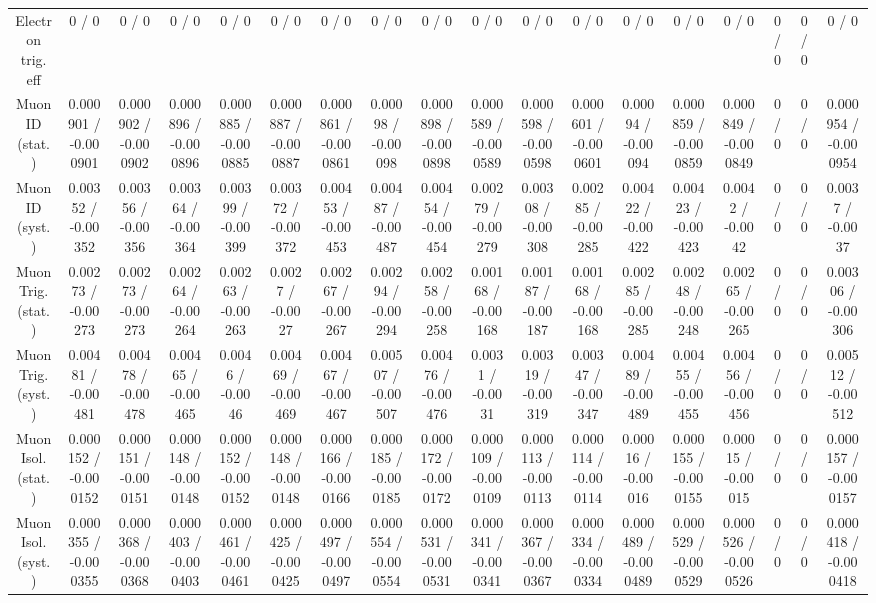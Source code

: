 \documentclass[10pt]{article}
\begin{document}
\begin{table}[htbp]
\begin{center}
\begin{tabular}{|c|c|c|c|c|c|c|c|c|c|c|c|c|c|c|c|c|c|}
  Electron trig. eff & 0 / 0 & 0 / 0 & 0 / 0 & 0 / 0 & 0 / 0 & 0 / 0 & 0 / 0 & 0 / 0 & 0 / 0 & 0 / 0 & 0 / 0 & 0 / 0 & 0 / 0 & 0 / 0 & 0 / 0 & 0 / 0 & 0 / 0 \\ 
  Muon ID (stat.) & 0.000901 / -0.000901 & 0.000902 / -0.000902 & 0.000896 / -0.000896 & 0.000885 / -0.000885 & 0.000887 / -0.000887 & 0.000861 / -0.000861 & 0.00098 / -0.00098 & 0.000898 / -0.000898 & 0.000589 / -0.000589 & 0.000598 / -0.000598 & 0.000601 / -0.000601 & 0.00094 / -0.00094 & 0.000859 / -0.000859 & 0.000849 / -0.000849 & 0 / 0 & 0 / 0 & 0.000954 / -0.000954 \\ 
  Muon ID (syst.) & 0.00352 / -0.00352 & 0.00356 / -0.00356 & 0.00364 / -0.00364 & 0.00399 / -0.00399 & 0.00372 / -0.00372 & 0.00453 / -0.00453 & 0.00487 / -0.00487 & 0.00454 / -0.00454 & 0.00279 / -0.00279 & 0.00308 / -0.00308 & 0.00285 / -0.00285 & 0.00422 / -0.00422 & 0.00423 / -0.00423 & 0.0042 / -0.0042 & 0 / 0 & 0 / 0 & 0.0037 / -0.0037 \\ 
  Muon Trig. (stat.) & 0.00273 / -0.00273 & 0.00273 / -0.00273 & 0.00264 / -0.00264 & 0.00263 / -0.00263 & 0.0027 / -0.0027 & 0.00267 / -0.00267 & 0.00294 / -0.00294 & 0.00258 / -0.00258 & 0.00168 / -0.00168 & 0.00187 / -0.00187 & 0.00168 / -0.00168 & 0.00285 / -0.00285 & 0.00248 / -0.00248 & 0.00265 / -0.00265 & 0 / 0 & 0 / 0 & 0.00306 / -0.00306 \\ 
  Muon Trig. (syst.) & 0.00481 / -0.00481 & 0.00478 / -0.00478 & 0.00465 / -0.00465 & 0.0046 / -0.0046 & 0.00469 / -0.00469 & 0.00467 / -0.00467 & 0.00507 / -0.00507 & 0.00476 / -0.00476 & 0.0031 / -0.0031 & 0.00319 / -0.00319 & 0.00347 / -0.00347 & 0.00489 / -0.00489 & 0.00455 / -0.00455 & 0.00456 / -0.00456 & 0 / 0 & 0 / 0 & 0.00512 / -0.00512 \\ 
  Muon Isol. (stat.) & 0.000152 / -0.000152 & 0.000151 / -0.000151 & 0.000148 / -0.000148 & 0.000152 / -0.000152 & 0.000148 / -0.000148 & 0.000166 / -0.000166 & 0.000185 / -0.000185 & 0.000172 / -0.000172 & 0.000109 / -0.000109 & 0.000113 / -0.000113 & 0.000114 / -0.000114 & 0.00016 / -0.00016 & 0.000155 / -0.000155 & 0.00015 / -0.00015 & 0 / 0 & 0 / 0 & 0.000157 / -0.000157 \\ 
  Muon Isol. (syst.) & 0.000355 / -0.000355 & 0.000368 / -0.000368 & 0.000403 / -0.000403 & 0.000461 / -0.000461 & 0.000425 / -0.000425 & 0.000497 / -0.000497 & 0.000554 / -0.000554 & 0.000531 / -0.000531 & 0.000341 / -0.000341 & 0.000367 / -0.000367 & 0.000334 / -0.000334 & 0.000489 / -0.000489 & 0.000529 / -0.000529 & 0.000526 / -0.000526 & 0 / 0 & 0 / 0 & 0.000418 / -0.000418 \\ 

\end{tabular}
\end{center}
\end{table}
\end{document}
